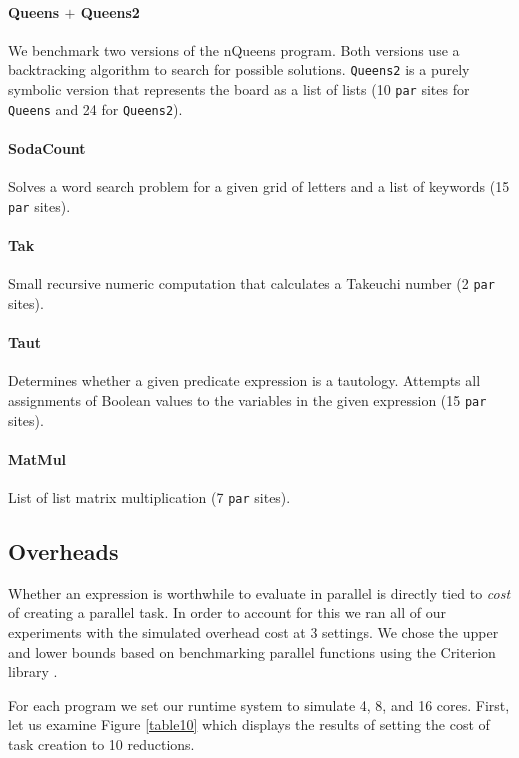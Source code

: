 \paragraph{Queens $+$ Queens2}
We benchmark two versions of the nQueens program. Both versions use a backtracking
algorithm to search for possible solutions. \texttt{Queens2} is a purely symbolic version
that represents the board as a list of lists (10 \verb-par- sites for \texttt{Queens} and
24 for \texttt{Queens2}).

\paragraph{SodaCount}
Solves a word search problem for a given grid of letters and a list of keywords
(15 \verb-par- sites).

\paragraph{Tak}
Small recursive numeric computation that calculates a Takeuchi number (2 \verb-par- sites).

\paragraph{Taut}
Determines whether a given predicate expression is a tautology. Attempts all assignments
of Boolean values to the variables in the given expression (15 \verb-par- sites).

\paragraph{MatMul}
List of list matrix multiplication (7 \verb-par- sites). 


\subsection*{Overheads} Whether an expression is worthwhile to evaluate in
parallel is directly tied to \emph{cost} of creating a parallel task. In order
to account for this we ran all of our experiments with the simulated overhead
cost at 3 settings. We chose the upper and lower bounds based on benchmarking parallel
functions using the Criterion library \citep{criterion}.


For each program we set our runtime system to simulate 4, 8, and 16 cores.
First, let us examine Figure \ref{table10} which displays the results of setting
the cost of task creation to 10 reductions.

